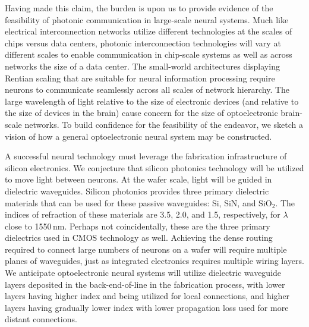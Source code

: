 \documentclass[twocolumn]{article}
\begin{document}
Having made this claim, the burden is upon us to provide evidence of the feasibility of photonic communication in large-scale neural systems. Much like electrical interconnection networks utilize different technologies at the scales of chips versus data centers, photonic interconnection technologies will vary at different scales to enable communication in chip-scale systems as well as across networks the size of a data center. The small-world architectures displaying Rentian scaling that are suitable for neural information processing require neurons to communicate seamlessly across all scales of network hierarchy. The large wavelength of light relative to the size of electronic devices (and relative to the size of devices in the brain) cause concern for the size of optoelectronic brain-scale networks. To build confidence for the feasibility of the endeavor, we sketch a vision of how a general optoelectronic neural system may be constructed.

A successful neural technology must leverage the fabrication infrastructure of silicon electronics. We conjecture that silicon photonics technology will be utilized to move light between neurons. At the wafer scale, light will be guided in dielectric waveguides. Silicon photonics provides three primary dielectric materials that can be used for these passive waveguides: Si, SiN, and SiO$_2$. The indices of refraction of these materials are 3.5, 2.0, and 1.5, respectively, for $\lambda$ close to 1550\,nm. Perhaps not coincidentally, these are the three primary dielectrics used in CMOS technology as well. Achieving the dense routing required to connect large numbers of neurons on a wafer will require multiple planes of waveguides, just as integrated electronics requires multiple wiring layers. We anticipate optoelectronic neural systems will utilize dielectric waveguide layers deposited in the back-end-of-line in the fabrication process, with lower layers having higher index and being utilized for local connections, and higher layers having gradually lower index with lower propagation loss used for more distant connections. 
\end{document}
